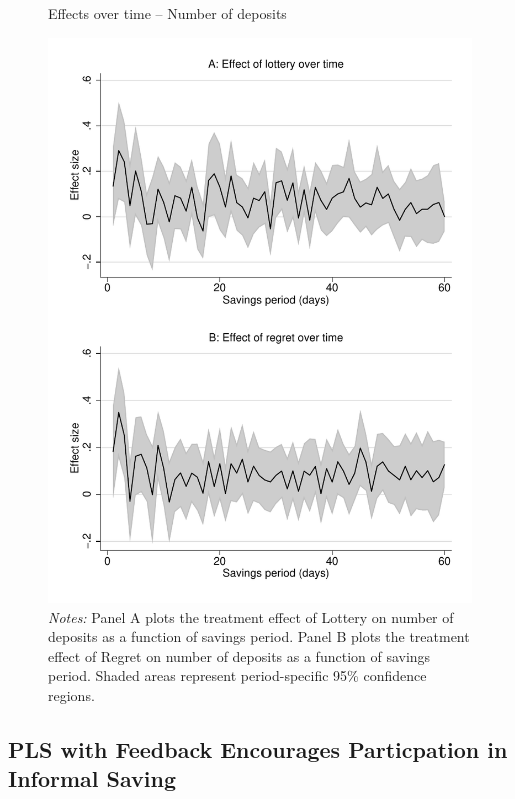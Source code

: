 \documentclass[11pt]{article}
\begin{document}
		\begin{figure}[ht]
		\caption{Effects over time -- Number of deposits}
		\includegraphics[width=\textwidth]{../../figures/line-timemobile_deposits.pdf}
		\caption*{\footnotesize \emph{Notes:} Panel A plots the treatment effect of Lottery on number of deposits as a function of savings period. Panel B plots the treatment effect of Regret on number of deposits as a function of savings period. Shaded areas represent period-specific 95\% confidence regions.}
		\end{figure}

	\subsection{PLS with Feedback Encourages Particpation in Informal Saving}
\end{document}
